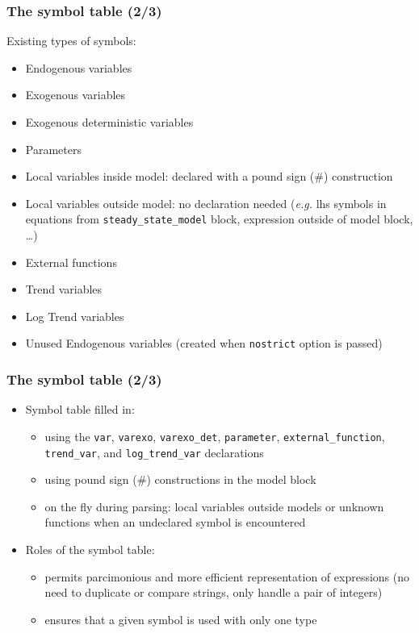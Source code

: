 \documentclass{beamer}
\begin{document}
\begin{frame}
  \frametitle{The symbol table (2/3)}
  Existing types of symbols:
  \begin{itemize}
  \item Endogenous variables
  \item Exogenous variables
  \item Exogenous deterministic variables
  \item Parameters
  \item Local variables inside model: declared with a pound sign (\#) construction
  \item Local variables outside model: no declaration needed (\textit{e.g.} lhs symbols in equations from \texttt{steady\_state\_model} block, expression outside of model block, \ldots)
  \item External functions
  \item Trend variables
  \item Log Trend variables
  \item Unused Endogenous variables (created when \texttt{nostrict} option is passed)
  \end{itemize}
\end{frame}

\begin{frame}
  \frametitle{The symbol table (2/3)}
  \begin{itemize}
  \item Symbol table filled in:
    \begin{itemize}
    \item using the \texttt{var}, \texttt{varexo}, \texttt{varexo\_det}, \texttt{parameter}, \texttt{external\_function}, \texttt{trend\_var}, and \texttt{log\_trend\_var} declarations
    \item using pound sign (\#) constructions in the model block
    \item on the fly during parsing: local variables outside models or unknown functions when an undeclared symbol is encountered
    \end{itemize}
  \item Roles of the symbol table:
    \begin{itemize}
    \item permits parcimonious and more efficient representation of expressions (no need to duplicate or compare strings, only handle a pair of integers)
    \item ensures that a given symbol is used with only one type
    \end{itemize}
  \end{itemize}
\end{frame}
\end{document}
